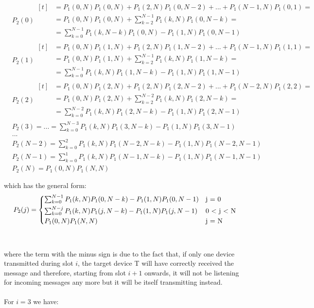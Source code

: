 \begin{align*}
    &P_{2}(0)
    	\begin{aligned}[t]
    		&= P_{1}(0, N)P_{1}(0, N) + P_{1}(2, N)P_{1}(0, N - 2) + ... + P_{1}(N-1, N)P_{1}(0, 1) = \\
			&= P_{1}(0, N)P_{1}(0, N) + \sum_{k=2}^{N-1}P_{1}(k, N)P_{1}(0, N-k) = \\
			&= \sum_{k=0}^{N-1}P_{1}(k, N-k)P_{1}(0, N) - P_{1}(1, N)P_{1}(0, N-1)
		\end{aligned}\\
	&P_{2}(1)
    	\begin{aligned}[t]
    		&= P_{1}(0, N)P_{1}(1, N) + P_{1}(2, N)P_{1}(1, N - 2) + ... + P_{1}(N-1, N)P_{1}(1, 1) = \\
			&= P_{1}(0, N)P_{1}(1, N) + \sum_{k=2}^{N-1}P_{1}(k, N)P_{1}(1, N-k) = \\
			&= \sum_{k=0}^{N-1}P_{1}(k, N)P_{1}(1, N - k) - P_{1}(1, N)P_{1}(1, N-1)
		\end{aligned}\\	
    &P_{2}(2)
    	\begin{aligned}[t]
    		&= P_{1}(0, N)P_{1}(2, N) + P_{1}(2, N)P_{1}(2, N - 2) + ... + P_{1}(N-2, N)P_{1}(2, 2) = \\
			&= P_{1}(0, N)P_{1}(2, N) + \sum_{k=2}^{N-2}P_{1}(k, N)P_{1}(2, N-k) = \\
			&= \sum_{k=0}^{N-2}P_{1}(k, N)P_{1}(2, N - k) - P_{1}(1, N)P_{1}(2, N-1)
		\end{aligned}\\	
	&P_{2}(3) = ... = \sum_{k=0}^{N-3}P_{1}(k, N)P_{1}(3, N - k) - P_{1}(1, N)P_{1}(3, N-1)\\
	&...\\
	&P_{2}(N-2) = \sum_{k=0}^{2}P_{1}(k, N)P_{1}(N-2, N - k) - P_{1}(1, N)P_{1}(N-2, N-1)\\
	&P_{2}(N-1) = \sum_{k=0}^{1}P_{1}(k, N)P_{1}(N-1, N - k) - P_{1}(1, N)P_{1}(N-1, N-1)\\
	&P_{2}(N) = P_{1}(0, N)P_{1}(N, N)
\end{align*}


which has the general form:
  \begin{equation}\label{eq:1}
    P_{2}(j) =
    \begin{cases*}
      \sum_{k=0}^{N-1}P_{1}(k, N)P_{1}(0, N - k) - P_{1}(1, N)P_{1}(0, N-1) & j = 0 \\
      \sum_{k=0}^{N-j}P_{1}(k, N)P_{1}(j, N - k) - P_{1}(1, N)P_{1}(j, N-1) & 0 $<$ j $<$ N \\
      P_{1}(0, N)P_{1}(N, N) & j = N \\
    \end{cases*}
  \end{equation}
\\
\\
where the term with the minus sign is due to the fact that, if only one device transmitted during slot $i$, the target device T will have correctly received the message and therefore, starting from slot $i+1$ onwards, it will not be listening for incoming messages any more but it will be itself transmitting instead.\\
\\
For $i=3$ we have:

